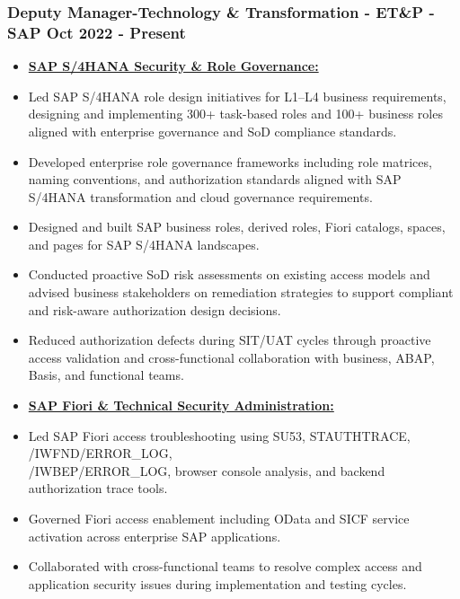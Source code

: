 \documentclass[10pt]{article}
\begin{document}
\subsubsection{Deputy Manager-Technology \& Transformation - ET\&P - SAP \hfill  Oct 2022 - Present \\}
\begin{itemize}
	\small
    	\item[] \textbf{\underline{SAP S/4HANA Security \& Role Governance:}}
			\item Led SAP S/4HANA role design initiatives for L1–L4 business requirements, designing and implementing 300+ task-based roles and 100+ business roles aligned with enterprise governance and SoD compliance standards.
			\item Developed enterprise role governance frameworks including role matrices, naming conventions, and authorization standards aligned with SAP S/4HANA transformation and cloud governance requirements.
			\item Designed and built SAP business roles, derived roles, Fiori catalogs, spaces, and pages for SAP S/4HANA landscapes.
			\item Conducted proactive SoD risk assessments on existing access models and advised business stakeholders on remediation strategies to support compliant and risk-aware authorization design decisions.
			\item Reduced authorization defects during SIT/UAT cycles through proactive access validation and cross-functional collaboration with business, ABAP, Basis, and functional teams.		
\end{itemize}

\begin{itemize}
	\small
    	\item[] \textbf{\underline{SAP Fiori \& Technical Security Administration:}}
			 \item Led SAP Fiori access troubleshooting using SU53, STAUTHTRACE, /IWFND/ERROR\_LOG, \\/IWBEP/ERROR\_LOG, browser console analysis, and backend authorization trace tools.
			\item Governed Fiori access enablement including OData and SICF service activation across enterprise SAP applications.
			\item Collaborated with cross-functional teams to resolve complex access and application security issues during implementation and testing cycles.
\end{itemize}
\end{document}
